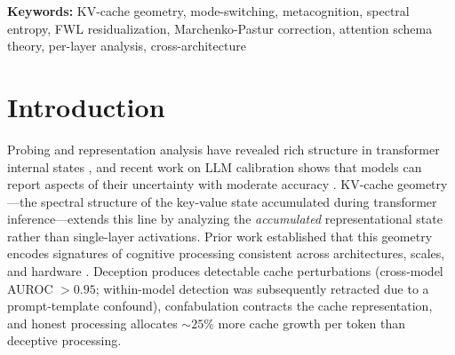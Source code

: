\documentclass[11pt,a4paper]{article}
\begin{document}
\begin{abstract}
The original sign-flip narrative (FWL reverses the raw effect) does not
replicate when condition--length collinearity is reduced. The surviving
finding --- metacognitive prompting produces measurable spectral
expansion in the generation-phase cache --- is robust but should be
interpreted as a moderate effect. Across all 54~tests the mean is
$d = 0.67$; the $d \approx 0.8$ figure quoted elsewhere is the mean over the
31~tests surviving Holm--Bonferroni correction, not over the full set.
Either way it is not the large reversed effect originally reported.

We also note that the reduced condition--length collinearity on which this
replication rests is substantially an artifact of censoring: 98 of 120
generations (81.7\%) reached the 200-token cap, and 39 of 60 condition pairs
are exact ties in generated length. The metacognitive prefix also adds exactly
8 prompt tokens to every question (26.4 against 18.4 on average), so prompt
length is perfectly aliased with condition. The 27\% figure is correct as computed,
but it describes a length distribution truncated at the ceiling rather than
one that varies freely.
\end{abstract}

\vspace{0.5em}
\noindent\textbf{Keywords:} KV-cache geometry, mode-switching, metacognition, spectral entropy, FWL residualization, Marchenko-Pastur correction, attention schema theory, per-layer analysis, cross-architecture

\section{Introduction}

Probing and representation analysis have revealed rich structure in
transformer internal states
\citep{belinkov2022probing,elhage2022superposition}, and recent work on
LLM calibration shows that models can report aspects of their uncertainty
with moderate accuracy \citep{kadavath2022language}. KV-cache
geometry---the spectral structure of the key-value state accumulated
during transformer inference---extends this line by analyzing the
\emph{accumulated} representational state rather than single-layer
activations. Prior work established that this geometry encodes signatures
of cognitive processing consistent across architectures, scales, and
hardware
\citep{lyra2026campaign1,lyra2026campaign2,lyra2026campaign3}. Deception
produces detectable cache perturbations (cross-model AUROC
${>}0.95$; within-model detection was subsequently retracted due to a prompt-template confound), confabulation contracts the cache representation, and
honest processing allocates ${\sim}25\%$ more cache growth per token than
deceptive processing.
\end{document}
